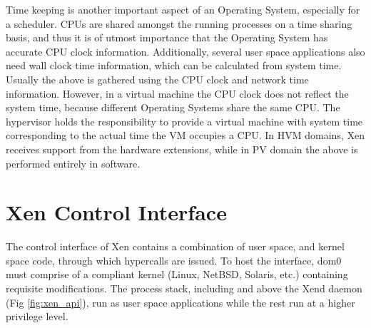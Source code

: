 Time keeping is another important aspect of an Operating System, especially for a scheduler. CPUs are shared amongst the running processes on a time sharing basis, and thus it is of utmost importance that the Operating System has accurate CPU clock information. Additionally, several user space applications also need wall clock time information, which can be calculated from system time. Usually the above is gathered using the CPU clock and network time information. However, in a virtual machine the CPU clock does not reflect the system time, because different Operating Systems share the same CPU. The hypervisor holds the responsibility to provide a virtual machine with system time corresponding to the actual time the VM occupies a CPU. In HVM domains, Xen receives support from the hardware extensions, while in PV domain the above is performed entirely in software. 

\section{Xen Control Interface}
The control interface of Xen contains a combination of user space, and kernel space code, through which hypercalls are issued. To host the interface, dom0 must comprise of a compliant kernel (Linux, NetBSD, Solaris, etc.) containing requisite modifications. The process stack, including and above the Xend daemon (Fig \ref{fig:xen_api}), run as user space applications while the rest run at a higher privilege level. 

